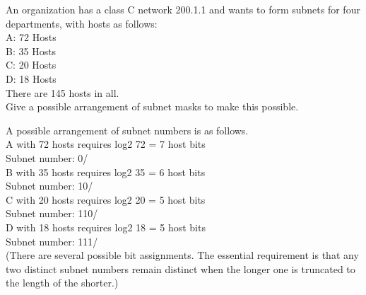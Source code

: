 \documentclass[answers,addpoints]{exam}
\begin{document}
\begin{questions}
\question
An organization has a class C network 200.1.1 and wants to form subnets for four departments, with hosts as follows:\\
A: 72 Hosts\\
B: 35 Hosts\\
C: 20 Hosts\\
D: 18 Hosts\\
There are 145 hosts in all.\\
Give a possible arrangement of subnet masks to make this possible.
\vspace{2in}
\begin{solution}
A possible arrangement of subnet numbers is as follows.\\
A with 72 hosts requires log2 72 = 7 host bits\\
Subnet number: 0/ \\
B with 35 hosts requires log2 35 = 6 host bits \\
Subnet number: 10/ \\
C with 20 hosts requires log2 20 = 5 host bits \\
Subnet number: 110/ \\
D with 18 hosts requires log2 18 = 5 host bits \\
Subnet number: 111/ \\
(There are several possible bit assignments. The essential requirement is that any two distinct subnet numbers remain distinct when the longer one is truncated to the length of the shorter.)
\end{solution}


\end{questions}
\end{document}
